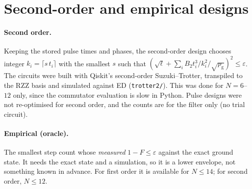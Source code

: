 \documentclass[11pt]{article}
\newcommand{\eps}{\varepsilon}
\newcommand{\pg}{p_{\mathrm g}}
\begin{document}
\section{Second-order and empirical designs}

\paragraph{Second order.} Keeping the stored pulse times and phases, the second-order design chooses integer
$k_i=\lceil s\,t_i\rceil$ with the smallest $s$ such that $(\sqrt\ell+\sum_i B_2t_i^3/k_i^2/\sqrt{\pg})^2\le\eps$.
The circuits were built with Qiskit's second-order Suzuki--Trotter, transpiled to the RZZ basis and simulated against
ED (\texttt{trotter2/}). This was done for $N=6$--$12$ only, since the commutator evaluation is slow in Python.
Pulse designs were not re-optimised for second order, and the counts are for the filter only (no trial circuit).

\paragraph{Empirical (oracle).} The smallest step count whose \emph{measured} $1-F\le\eps$ against the exact ground
state. It needs the exact state and a simulation, so it is a lower envelope, not something known in advance. For first
order it is available for $N\le14$; for second order, $N\le12$.
\end{document}
